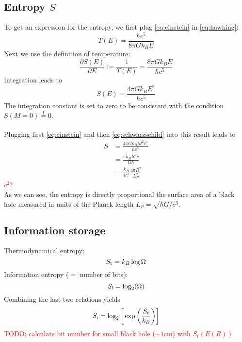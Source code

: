 \subsection{Entropy $S$}
    To get an expression for the entropy, we first plug 
    \autoref{eq:einstein} in \autoref{eq:hawking}:
    \begin{equation}
        T(E)=\frac{\hbar c^5}{8\pi Gk_BE}
    \end{equation}
    Next we use the definition of temperature:
    \begin{equation}
        \frac{\partial S(E)}{\partial E}:=\frac{1}{T(E)}
        =\frac{8\pi Gk_BE}{\hbar c^5}
    \end{equation}
    Integration leads to
    \begin{equation}
        S(E)=\frac{4\pi Gk_BE^2}{\hbar c^5}
    \end{equation}
    The integration constant is set to zero to be consistent with 
    the condition $S(M=0)\overset{!}{=}0$. \\
    \\
    Plugging first \autoref{eq:einstein} and then \autoref{eq:schwarzschild} 
    into this result leads to
    \begin{align}
        S
        &=\frac{4\pi Gk_BM^2c^4}{\hbar c^5} \\
        &=\frac{\pi k_BR^2c}{G\hbar} \\
        &=\frac{k_B}{4c^2}\frac{4\pi R^2}{L_P^2}
    \end{align}
    \textcolor{red}{$c^2$?} \\
    As we can see, the entropy is directly proportional the surface area of a 
    black hole measured in units of the Planck length $L_P=\sqrt{\hbar G/c^3}$.

\subsection{Information storage}
    Thermodynamical entropy:
    \begin{equation}
        S_\textnormal{t}=k_B\log{\Omega}
        \label{}
    \end{equation}
    Information entropy ($=$ number of bits):
    \begin{equation}
        S_\textnormal{i}=\log_2(\Omega)
    \end{equation}
    Combining the last two relations yields
    \begin{equation}
        S_\textnormal{i}=\log_2\bigg[\exp\bigg(\frac{S_t}{k_B}\bigg)\bigg]
    \end{equation}
    \textcolor{red}{
        TODO: calculate bit number for small black hole 
        ($\sim1$cm) with $S_t(E(R))$
    }

